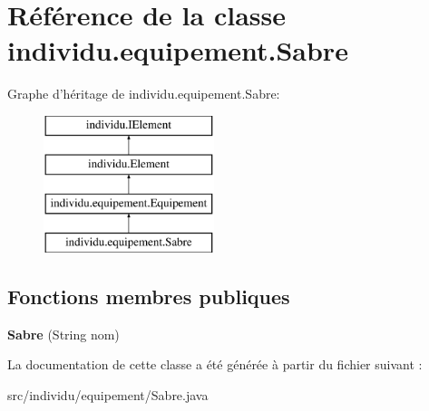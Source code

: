 \hypertarget{classindividu_1_1equipement_1_1_sabre}{\section{Référence de la classe individu.\-equipement.\-Sabre}
\label{classindividu_1_1equipement_1_1_sabre}
}
Graphe d'héritage de individu.\-equipement.\-Sabre\-:\begin{figure}[H]
\begin{center}
\leavevmode
\includegraphics[height=4.000000cm]{classindividu_1_1equipement_1_1_sabre}
\end{center}
\end{figure}
\subsection*{Fonctions membres publiques}
\begin{DoxyCompactItemize}
\item 
\hypertarget{classindividu_1_1equipement_1_1_sabre_a0480e9c7f234f72d0453950787e0421e}{{\bfseries Sabre} (String nom)}\label{classindividu_1_1equipement_1_1_sabre_a0480e9c7f234f72d0453950787e0421e}

\end{DoxyCompactItemize}


La documentation de cette classe a été générée à partir du fichier suivant \-:\begin{DoxyCompactItemize}
\item 
src/individu/equipement/Sabre.\-java\end{DoxyCompactItemize}
